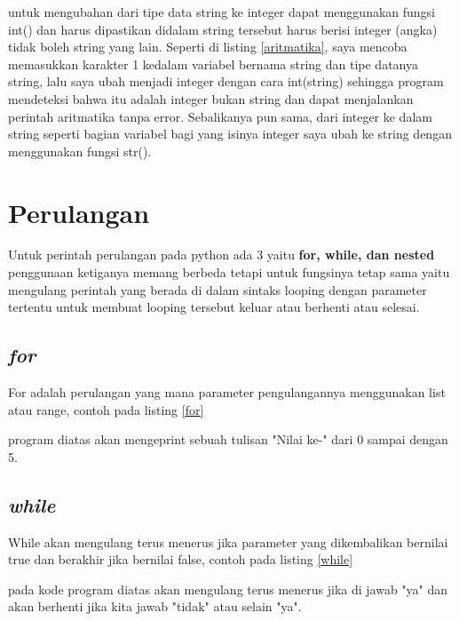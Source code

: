 

untuk mengubahan dari tipe data string ke integer dapat menggunakan fungsi int() dan harus dipastikan didalam string tersebut harus berisi integer (angka) tidak boleh string yang lain. Seperti di listing \ref{aritmatika}, saya mencoba memasukkan karakter 1 kedalam variabel bernama string dan tipe datanya string, lalu saya ubah menjadi integer dengan cara int(string) sehingga program mendeteksi bahwa itu adalah integer bukan string dan dapat menjalankan perintah aritmatika tanpa error. Sebalikanya pun sama, dari integer ke dalam string seperti bagian variabel bagi yang isinya integer saya ubah ke string dengan menggunakan fungsi str().

\section{Perulangan}
Untuk perintah perulangan pada python ada 3 yaitu \textbf{for, while, dan nested} penggunaan ketiganya memang berbeda tetapi untuk fungsinya tetap sama yaitu mengulang perintah yang berada di dalam sintaks looping dengan parameter tertentu untuk membuat looping tersebut keluar atau berhenti atau selesai.

\subsection{\textit{for}}
For adalah perulangan yang mana parameter pengulangannya menggunakan list atau range, contoh pada listing \ref{for}



program diatas akan mengeprint sebuah tulisan "Nilai ke-" dari 0 sampai dengan 5.

\subsection{\textit{while}}
While akan mengulang terus menerus jika parameter yang dikembalikan bernilai true dan berakhir jika bernilai false, contoh pada listing \ref{while}



pada kode program diatas akan mengulang terus menerus jika di jawab "ya" dan akan berhenti jika kita jawab "tidak" atau selain "ya".

